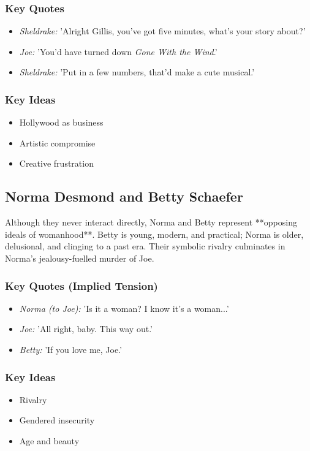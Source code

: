 \documentclass[a4paper]{article}
\begin{document}
\subsubsection*{Key Quotes}
\begin{itemize}
    \item \textit{Sheldrake:} 'Alright Gillis, you’ve got five minutes, what's your story about?'
    \item \textit{Joe:} 'You’d have turned down \textit{Gone With the Wind}.'
    \item \textit{Sheldrake:} 'Put in a few numbers, that’d make a cute musical.'
\end{itemize}

\subsubsection*{Key Ideas}
\begin{itemize}
    \item Hollywood as business
    \item Artistic compromise
    \item Creative frustration
\end{itemize}

\subsection{Norma Desmond and Betty Schaefer}
Although they never interact directly, Norma and Betty represent **opposing ideals of womanhood**. Betty is young, modern, and practical; Norma is older, delusional, and clinging to a past era. Their symbolic rivalry culminates in Norma's jealousy-fuelled murder of Joe.

\subsubsection*{Key Quotes (Implied Tension)}
\begin{itemize}
    \item \textit{Norma (to Joe):} 'Is it a woman? I know it's a woman...'
    \item \textit{Joe:} 'All right, baby. This way out.'
    \item \textit{Betty:} 'If you love me, Joe.'
\end{itemize}

\subsubsection*{Key Ideas}
\begin{itemize}
    \item Rivalry
    \item Gendered insecurity
    \item Age and beauty
\end{itemize}
\end{document}
